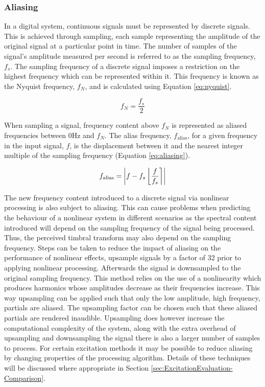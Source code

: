 		\subsubsection*{Aliasing}
			In a digital system, continuous signals must be represented by discrete signals. This is achieved
			through sampling, each sample representing the amplitude of the original signal at a particular
			point in time. The number of samples of the signal's amplitude measured per second is referred to as
			the sampling frequency, $f_{s}$. The sampling frequency of a discrete signal imposes a restriction
			on the highest frequency which can be represented within it. This frequency is known as the Nyquist
			frequency, $f_{N}$, and is calculated using Equation \ref{eq:nyquist}.

			\begin{equation}
				f_{N} = \frac{f_{s}}{2}
				\label{eq:nyquist}
			\end{equation}

			When sampling a signal, frequency content above $f_{N}$ is represented as aliased frequencies
			between 0Hz and $f_{N}$. The alias frequency, $f_{\mathrm{alias}}$, for a given frequency in the
			input signal, $f$, is the displacement between it and the nearest integer multiple of the sampling
			frequency (Equation \ref{eq:aliasing}).

			\begin{equation}
				f_{\mathrm{alias}} = \left|f - f_{s}\left\lfloor\frac{f}{f_{s}}\right\rceil\right|
				\label{eq:aliasing}
			\end{equation}

			The new frequency content introduced to a discrete signal via nonlinear processing is also subject
			to aliasing. This can cause problems when predicting the behaviour of a nonlinear system in
			different scenarios as the spectral content introduced will depend on the sampling frequency of the
			signal being processed. Thus, the perceived timbral transform may also depend on the sampling
			frequency. Steps can be taken to reduce the impact of aliasing on the performance of nonlinear
			effects, \citep{vetter2013estimation} upsample signals by a factor of 32 prior to applying nonlinear
			processing. Afterwards the signal is downsampled to the original sampling frequency. This method
			relies on the use of a nonlinearity which produces harmonics whose amplitudes decrease as their
			frequencies increase. This way upsampling can be applied such that only the low amplitude, high
			frequency, partials are aliased. The upsampling factor can be chosen such that these aliased
			partials are rendered inaudible. Upsampling does however increase the computational complexity of
			the system, along with the extra overhead of upsampling and downsampling the signal there is also a
			larger number of samples to process. For certain excitation methods it may be possible to reduce
			aliasing by changing properties of the processing algorithm. Details of these techniques will be
			discussed where appropriate in Section \ref{sec:ExcitationEvaluation-Comparison}.

